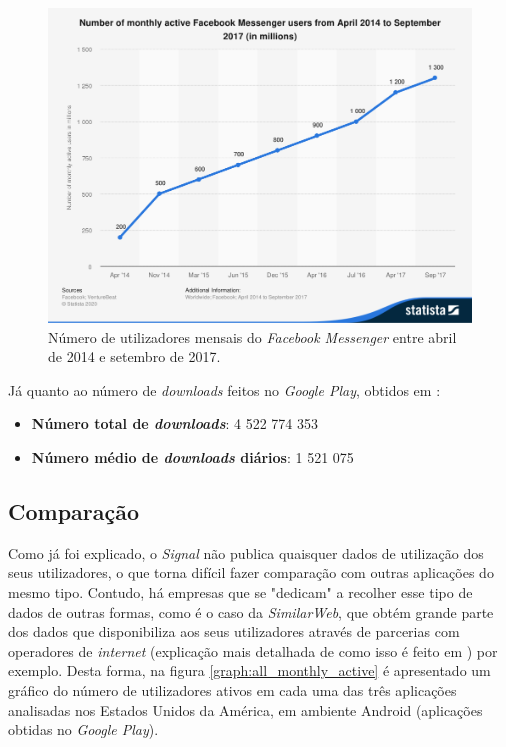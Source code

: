 \begin{figure}[H]
   \begin{center}
       \includegraphics[width=17cm]{img/statistic_id417295_facebook-messenger_-number-of-monthly-active-users-2014-2017.png}
       \caption{Número de utilizadores mensais do \textit{Facebook Messenger} entre abril de 2014 e setembro de 2017. \cite{messenger_monthly_users}}
       \label{graph:messenger_monthly_active}
   \end{center}
\end{figure}

Já quanto ao número de \textit{downloads} feitos no \textit{Google Play}, obtidos em \cite{messenger_downloads_android}:

\begin{itemize}
   \item \textbf{Número total de \textit{downloads}}: 4 522 774 353
   \item \textbf{Número médio de \textit{downloads} diários}: 1 521 075
\end{itemize}


\subsection{Comparação}
Como já foi explicado, o \textit{Signal} não publica quaisquer dados de utilização dos seus utilizadores, o que torna difícil fazer comparação com outras aplicações do mesmo tipo. Contudo, há empresas que se "dedicam" a recolher esse tipo de dados de outras formas, como é o caso da \textit{SimilarWeb}, que obtém grande parte dos dados que disponibiliza aos seus utilizadores através de parcerias com operadores de \textit{internet} (explicação mais detalhada de como isso é feito em \cite{first_report}) por exemplo. \cite{similar_web_methodology}
Desta forma, na figura \ref{graph:all_monthly_active} é apresentado um gráfico do número de utilizadores ativos em cada uma das três aplicações analisadas nos Estados Unidos da América, em ambiente Android (aplicações obtidas no \textit{Google Play}).

